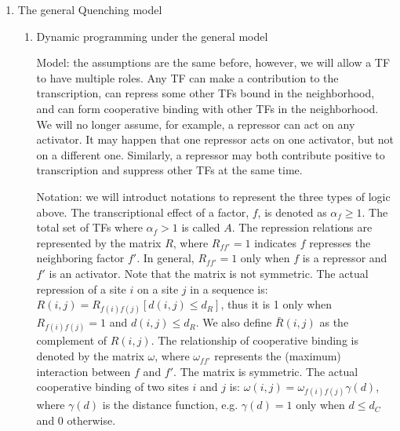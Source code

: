 \documentclass[11pt]{article}
\begin{document}
\begin{enumerate}
\newpage

\item{The general Quenching model} 

\begin{enumerate}

\item{Dynamic programming under the general model} 

Model: the assumptions are the same before, however, we will allow a TF to have multiple roles. Any TF can make a contribution to the transcription, can repress some other TFs bound in the neighborhood, and can form cooperative binding with other TFs in the neighborhood. We will no longer assume, for example, a repressor can act on any activator. It may happen that one repressor acts on one activator, but not on a different one. Similarly, a repressor may both contribute positive to transcription and suppress other TFs at the same time. 

Notation: we will introduct notations to represent the three types of logic above. The transcriptional effect of a factor, $f$, is denoted as $\alpha_f \geq 1$. The total set of TFs where $\alpha_f > 1$ is called $A$. The repression relations are represented by the matrix $R$, where $R_{ff'} = 1$ indicates $f$ represses the neighboring factor $f'$. In general, $R_{ff'} = 1$ only when $f$ is a repressor and $f'$ is an activator. Note that the matrix is not symmetric. The actual repression of a site $i$ on a site $j$ in a sequence is: $R(i,j) = R_{f(i)f(j)} [d(i,j) \leq d_R]$, thus it is 1 only when $R_{f(i)f(j)} = 1$ and $d(i,j) \leq d_R$. We also define $\bar{R}(i,j)$ as the complement of $R(i,j)$. The relationship of cooperative binding is denoted by the matrix $\omega$, where $\omega_{ff'}$ represents the (maximum) interaction between $f$ and $f'$. The matrix is symmetric. The actual cooperative binding of two sites $i$ and $j$ is: $\omega(i,j) = \omega_{f(i)f(j)} \gamma(d)$, where $\gamma(d)$ is the distance function, e.g. $\gamma(d) = 1$ only when $d \leq d_C$ and 0 otherwise. 


\end{enumerate}
\end{enumerate}
\end{document}
